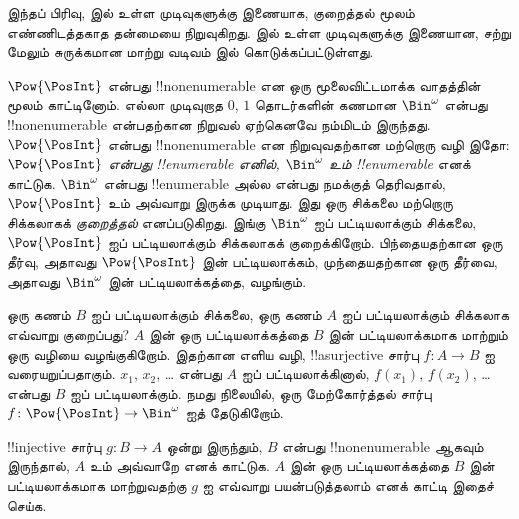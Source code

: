 \documentclass[../../../include/open-logic-section]{subfiles}
\begin{document}


\begin{editorial}
இந்தப் பிரிவு,  இல் உள்ள முடிவுகளுக்கு இணையாக,
குறைத்தல் மூலம் எண்ணிடத்தகாத தன்மையை நிறுவுகிறது.
 இல் உள்ள முடிவுகளுக்கு இணையான,
சற்று மேலும் சுருக்கமான மாற்று வடிவம்
 இல் கொடுக்கப்பட்டுள்ளது.
\end{editorial}

$\Pow{\PosInt}$ என்பது !!{nonenumerable} என ஒரு
மூலைவிட்டமாக்க வாதத்தின் மூலம் காட்டினோம்.
எல்லா முடிவுறாத $0$, $1$ தொடர்களின் கணமான $\Bin^\omega$
என்பது !!{nonenumerable} என்பதற்கான நிறுவல் ஏற்கெனவே நம்மிடம் இருந்தது.
$\Pow{\PosInt}$ என்பது !!{nonenumerable} என நிறுவுவதற்கான
மற்றொரு வழி இதோ:
\emph{$\Pow{\PosInt}$ என்பது !!{enumerable} எனில்,
$\Bin^\omega$ உம் !!{enumerable}} எனக் காட்டுக.
$\Bin^\omega$ என்பது !!{enumerable} அல்ல என்பது நமக்குத் தெரிவதால்,
$\Pow{\PosInt}$ உம் அவ்வாறு இருக்க முடியாது.
இது ஒரு சிக்கலை மற்றொரு சிக்கலாகக் \emph{குறைத்தல்} எனப்படுகிறது.
இங்கு $\Bin^\omega$ ஐப் பட்டியலாக்கும் சிக்கலை,
$\Pow{\PosInt}$ ஐப் பட்டியலாக்கும் சிக்கலாகக் குறைக்கிறோம்.
பிந்தையதற்கான ஒரு தீர்வு, அதாவது $\Pow{\PosInt}$ இன் பட்டியலாக்கம்,
முந்தையதற்கான ஒரு தீர்வை, அதாவது $\Bin^\omega$ இன் பட்டியலாக்கத்தை,
வழங்கும்.

ஒரு கணம் $B$ ஐப் பட்டியலாக்கும் சிக்கலை,
ஒரு கணம் $A$ ஐப் பட்டியலாக்கும் சிக்கலாக எவ்வாறு குறைப்பது?
$A$ இன் ஒரு பட்டியலாக்கத்தை $B$ இன் பட்டியலாக்கமாக மாற்றும்
ஒரு வழியை வழங்குகிறோம்.
இதற்கான எளிய வழி, !!a{surjective} சார்பு
$f\colon A \to B$ ஐ வரையறுப்பதாகும்.
$x_1$, $x_2$, \dots{} என்பது $A$ ஐப் பட்டியலாக்கினால்,
$f(x_1)$, $f(x_2)$, \dots{} என்பது $B$ ஐப் பட்டியலாக்கும்.
நமது நிலையில், ஒரு மேற்கோர்த்தல் சார்பு
$f\colon \Pow{\PosInt} \to \Bin^\omega$ ஐத் தேடுகிறோம்.

\begin{prob}
!!{injective} சார்பு $g\colon B \to A$ ஒன்று இருந்தும்,
$B$ என்பது !!{nonenumerable} ஆகவும் இருந்தால்,
$A$ உம் அவ்வாறே எனக் காட்டுக.
$A$ இன் ஒரு பட்டியலாக்கத்தை $B$ இன் பட்டியலாக்கமாக மாற்றுவதற்கு
$g$ ஐ எவ்வாறு பயன்படுத்தலாம் எனக் காட்டி இதைச் செய்க.
\end{prob}
\end{document}

